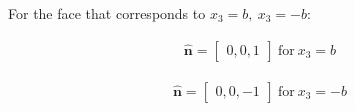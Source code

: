 \begin{problem}
\begin{enumerate}
For the face that corresponds to \(x_{3}=b,\ x_{3}=-b  \):

\begin{align}
\mathbf{\hat{n}}=\begin{bmatrix}
0,0,1
\end{bmatrix} \ \text{for} \ x_{3}=b
\end{align}

\begin{align}
\mathbf{\hat{n}}=\begin{bmatrix}
0,0,-1
\end{bmatrix} \ \text{for} \ x_{3}=-b
\end{align}



\end{enumerate}
\end{problem}
